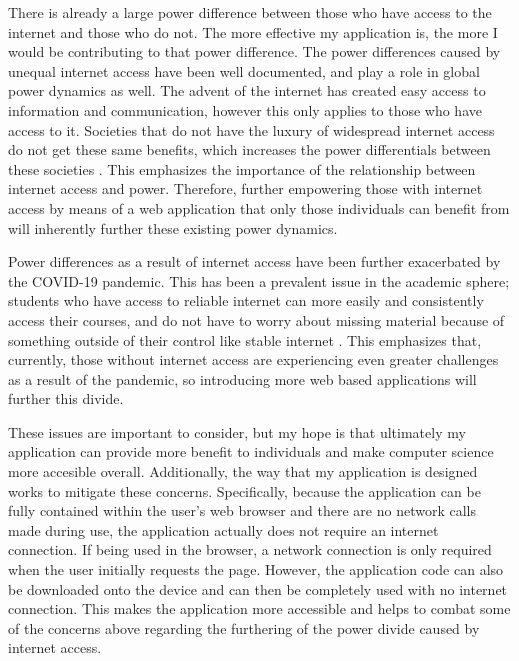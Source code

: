 \documentclass[10pt,twocolumn]{article}
\begin{document}
There is already a large power difference between those who have access to the internet 
and those who do not. The more effective my application is, the more I would be contributing to that power difference. 
The power differences caused by unequal internet access have been well documented, and play a role in global power 
dynamics as well. The advent of the internet has created easy access to information and communication, however this only 
applies to those who have access to it. Societies that do not have the luxury of widespread internet access do not get 
these same benefits, which increases the power differentials between these societies \cite{Fang2018Article}. This 
emphasizes the importance of the relationship between internet access and power. Therefore, further empowering those 
with internet access by means of a web application that only those individuals can benefit from will inherently further 
these existing power dynamics.

Power differences as a result of internet access have been further exacerbated by the COVID-19 pandemic. This has been a 
prevalent issue in the academic sphere; students 
who have access to reliable internet can more easily and consistently access their courses, and do not have to worry 
about missing material because of something outside of their control like stable internet \cite{Lai2020Article}. 
This emphasizes that, currently, those without internet access are experiencing even greater challenges as a result of 
the pandemic, so introducing more web based applications will further this divide. 

These issues are important to 
consider, but my hope is that ultimately my application can provide more benefit to individuals and make computer 
science more accesible overall. Additionally, the way that my application is designed works to mitigate these concerns.
Specifically, because the application can be fully contained within the user's web browser and there are no network calls 
made during use, the application actually does not require an internet connection. If being used in the browser, a 
network connection is only required when the user initially requests the page. However, the application code can also 
be downloaded onto the device and can then be completely used with no internet connection. This makes the application 
more accessible and helps to combat some of the concerns above regarding the furthering of the power divide caused by 
internet access. 

\end{document}
